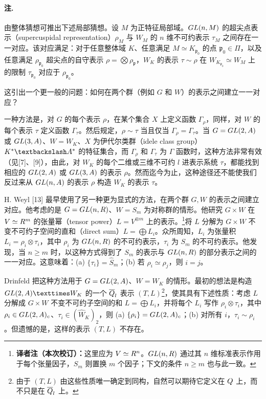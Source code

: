 \paragraph*{注.} 由整体猜想可推出下述局部猜想。设 $M$ 为正特征局部域。$GL(n,M)$ 的超尖点表示（supercuspidal representation）$\rho_M$ 与 $W_M$ 的 $n$ 维不可约表示 $\tau_M$ 之间存在一一对应。该对应满足：对于任意整体域 $K$、任意满足 $M\simeq K_{\mathfrak p_0}$ 的点 $\mathfrak p_0\in\Pi$，以及任意满足 $\rho_{\mathfrak p_0}$ 超尖点的自守表示 $\rho=\bigotimes\rho_{\mathfrak p}$，$W_K$ 的表示 $\tau\sim\rho$ 在 $W_{K_{\mathfrak p_0}}\simeq W_M$ 上的限制 $\tau_{\mathfrak p_0}$ 对应于 $\rho_{\mathfrak p_0}$。

这引出一个更一般的问题：如何在两个群（例如 $G$ 和 $W$）的表示之间建立一一对应？

一种方法是，对 $G$ 的每个表示 $\rho$，在某个集合 $X$ 上定义函数 $\Gamma_\rho$，同样，对 $W$ 的每个表示 $\tau$ 定义函数 $\Gamma_\tau$。然后规定，$\rho\sim\tau$ 当且仅当 $\Gamma_\rho=\Gamma_\tau$。当 $G=GL(2,A)$ 或 $GL(3,A)$、$W=W_K$、$X$ 为伊代尔类群（idele class group）$K^*\backslash\A^*$ 的特征集合，而 $\Gamma_\rho$ 和 $\Gamma_\tau$ 为 $\Gamma$ 函数时，这种方法非常有效（见[7]、[9]），由此，对 $W_K$ 的每个二维或三维不可约 $l$ 进表示系统 $\tau$，都能找到相应的 $GL(2,A)$ 或 $GL(3,A)$ 的表示 $\rho$。然而迄今为止，这种途径还不能使我们反过来从 $GL(n,A)$ 的表示 $\rho$ 构造 $W_K$ 的表示 $\tau$。

H. Weyl [13] 最早使用了另一种更为显式的方法，在两个群 $G,W$ 的表示之间建立对应。他考虑的是 $G=GL(n,R)$、$W=S_m$ 为对称群的情形。他研究 $G\times W$ 在 $V\simeq R^m$ 的张量幂（tensor power）$L=V^{\otimes m}$ 上的表示。\footnote{\textbf{译者注（本次校订）：}这里应为 $V\simeq R^n$。$GL(n,R)$ 通过其 $n$ 维标准表示作用于每个张量因子，$S_m$ 则置换 $m$ 个因子；下文的条件 $n\ge m$ 也与此一致。}将 $L$ 分解为 $G\times W$ 不变不可约子空间的直和（direct sum）$L=\bigoplus L_i$。众所周知，$L_i$ 为张量积 $L_i=\rho_i\otimes\tau_i$，其中 $\rho_i$ 为 $GL(n,R)$ 的不可约表示，$\tau_i$ 为 $S_m$ 的不可约表示。他发现，当 $n\geq m$ 时，以这种方式得到了 $S_m$ 的表示与 $GL(n,R)$ 的部分表示之间的一一对应。这意味着：(a) $\{\tau_i\}=\widehat S_m$；(b) 若 $\rho_i\simeq\rho_j$，则 $i=j$。

Drinfeld 把这种方法用于 $G=GL(2,A)$、$W=W_K$ 的情形。最初的想法是构造 $\GL(2,\A)\times W_K$ 的一个 $\overline{Q}_l$ 表示 $(T,L)$\footnote{由于 $(T,L)$ 由这些性质唯一确定到同构，自然可以期待它定义在 $Q$ 上，而不只是在 $\overline{Q}_l$ 上。}，使其具有下述性质：考虑 $L$ 分解成 $G\times W$ 不变不可约子空间的和 $L=\bigoplus L_i$，并将每个 $L_i$ 写作 $\rho_i\otimes\tau_i$，其中 $\rho_i\in GL(2,A)_c$、$\tau_i\in(\widehat W_K)_2$，则 (a) $\{\rho_i\}=GL(2,A)_c$；(b) 对所有 $i$，$\tau_i\sim\rho_i$。但遗憾的是，这样的表示 $(T,L)$ 不存在。

